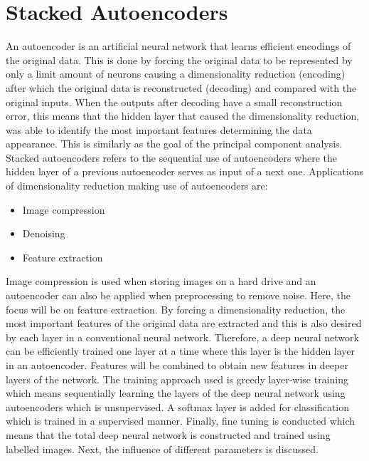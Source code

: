 \documentclass[a4paper,10pt]{article}
\begin{document}
\section{Stacked Autoencoders}
An autoencoder is an artificial neural network that learns efficient encodings of the original data. This is done by forcing the original data to be represented by only a limit amount of neurons causing a dimensionality reduction (encoding) after which the original data is reconstructed (decoding) and compared with the original inputs. When the outputs after decoding have a small reconstruction error, this means that the hidden layer that caused the dimensionality reduction, was able to identify the most important features determining the data appearance. This is similarly as the goal of the principal component analysis. Stacked autoencoders refers to the sequential use of autoencoders where the hidden layer of a previous autoencoder serves as input of a next one. Applications of dimensionality reduction making use of autoencoders are:
\begin{itemize}
	\item Image compression
	\item Denoising
	\item Feature extraction
\end{itemize}

Image compression is used when storing images on a hard drive and an autoencoder can also be applied when preprocessing to remove noise. Here, the focus will be on feature extraction. By forcing a dimensionality reduction, the most important features of the original data are extracted and this is also desired by each layer in a conventional neural network. Therefore, a deep neural network can be efficiently trained one layer at a time where this layer is the hidden layer in an autoencoder. Features will be combined to obtain new features in deeper layers of the network. The training approach used is greedy layer-wise training which means sequentially learning the layers of the deep neural network using autoencoders which is unsupervised. A softmax layer is added for classification which is trained in a supervised manner. Finally, fine tuning is conducted which means that the total deep neural network is constructed and trained using labelled images. Next, the influence of different parameters is discussed. 
\end{document}
